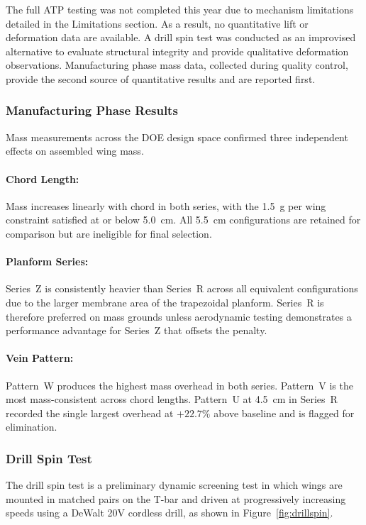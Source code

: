 The full ATP testing was not completed this year due to mechanism limitations detailed in the Limitations section. As a result, no quantitative lift or deformation data are available. A drill spin test was conducted as an improvised alternative to evaluate structural integrity and provide qualitative deformation observations. Manufacturing phase mass data, collected during quality control, provide the second source of quantitative results and are reported first.

\subsubsection{Manufacturing Phase Results}

Mass measurements across the DOE design space confirmed three independent effects on assembled wing mass.

\paragraph{Chord Length:}
Mass increases linearly with chord in both series, with the 1.5~g per wing constraint satisfied at or below 5.0~cm. All 5.5~cm configurations are retained for comparison but are ineligible for final selection.

\paragraph{Planform Series:}
Series~Z is consistently heavier than Series~R across all equivalent configurations due to the larger membrane area of the trapezoidal planform. Series~R is therefore preferred on mass grounds unless aerodynamic testing demonstrates a performance advantage for Series~Z that offsets the penalty.

\paragraph{Vein Pattern:}
Pattern~W produces the highest mass overhead in both series. Pattern~V is the most mass-consistent across chord lengths. Pattern~U at 4.5~cm in Series~R recorded the single largest overhead at $+22.7\%$ above baseline and is flagged for elimination.

\subsubsection{Drill Spin Test}

The drill spin test is a preliminary dynamic screening test in which wings are mounted in matched pairs on the T-bar and driven at progressively increasing speeds using a DeWalt 20V cordless drill, as shown in Figure~\ref{fig:drillspin}. 

